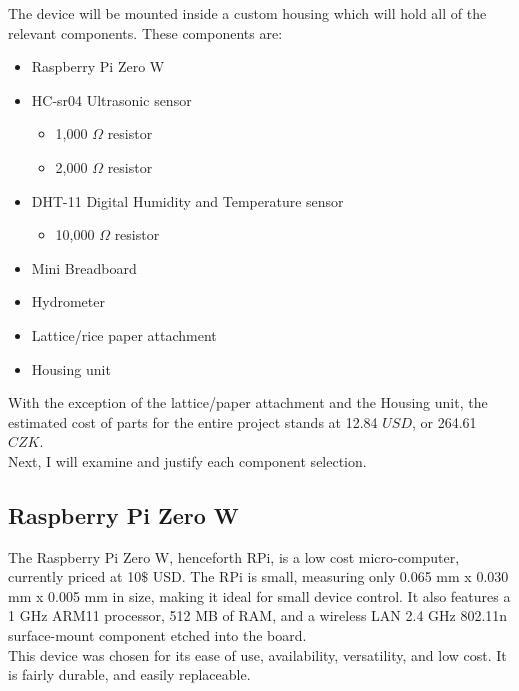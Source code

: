 \documentclass[twoside]{ctuthesis}
\theoremstyle{plain}
\theoremstyle{definition}
\theoremstyle{note}
\begin{document}
The device will be mounted inside a custom housing which will hold all of the relevant components. These components are:

\begin{itemize}
	\item Raspberry Pi Zero W
	\item HC-sr04 Ultrasonic sensor
	\begin{itemize}
		\item 1,000 $\Omega$ resistor
		\item 2,000 $\Omega$ resistor
	\end{itemize}
	\item DHT-11 Digital Humidity and Temperature sensor
	\begin{itemize}
		\item 10,000 $\Omega$ resistor
	\end{itemize}
	\item Mini Breadboard
	\item Hydrometer
	\item Lattice/rice paper attachment
	\item Housing unit
\end{itemize}

With the exception of the lattice/paper attachment and the Housing unit, the estimated cost of parts for the entire project stands at 12.84 $USD$, or 264.61 $CZK$.\\
Next, I will examine and justify each component selection.

\subsection{Raspberry Pi Zero W}
The Raspberry Pi Zero W, henceforth RPi, is a low cost micro-computer, currently priced at 10$\$$ USD. The RPi is small, measuring only 0.065 mm x 0.030 mm x 0.005 mm in size, making it ideal for small device control. It also features a 1 GHz ARM11 processor, 512 MB of RAM, and a wireless LAN 2.4 GHz 802.11n surface-mount component etched into the board.\\
This device was chosen for its ease of use, availability, versatility, and low cost. It is fairly durable, and easily replaceable.
\end{document}
